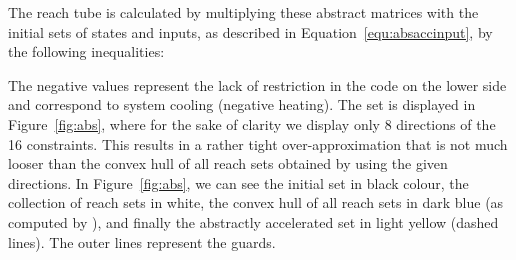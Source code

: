\documentclass{IEEEtran}
\begin{document}
The reach tube is calculated by multiplying these abstract matrices with the
initial sets of states and inputs, as described in
Equation~\eqref{equ:absaccinput}, by the following inequalities:

The negative values represent the lack of restriction in the code on the lower side and correspond to system cooling (negative heating). 
The set is displayed in Figure~\ref{fig:abs}, where for the sake of clarity we display only 8 directions of the 16 constraints. 
This results in a rather tight over-approximation that is not much looser than the convex hull of all reach sets obtained by \cite{FLD+11} using the given directions. 
In Figure~\ref{fig:abs}, we can see the initial set in black colour, 
the collection of reach sets in white, 
the convex hull of all reach sets in dark blue (as computed by \cite{FLD+11}), 
and finally the abstractly accelerated set in light yellow (dashed lines). 
The outer lines represent the guards. 
\end{document}
